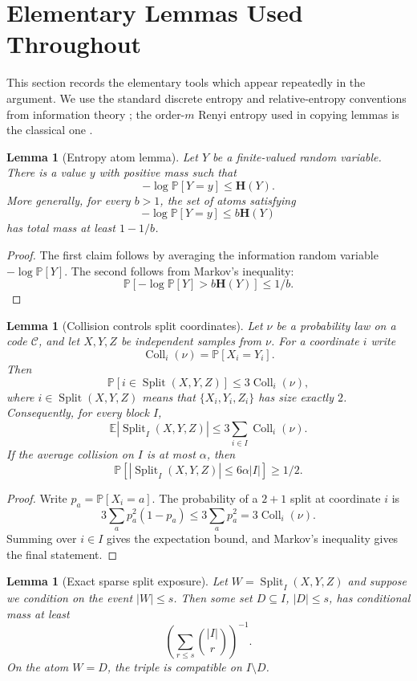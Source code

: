 \documentclass[11pt]{article}
\newtheorem{lemma}[theorem]{Lemma}
\newcommand{\C}{\mathcal C}
\newcommand{\Prb}{\mathbb P}
\newcommand{\EE}{\mathbb E}
\newcommand{\bfH}{\mathbf H}
\newcommand{\Coll}{\operatorname{Coll}}
\newcommand{\Split}{\operatorname{Split}}
\begin{document}
\section{Elementary Lemmas Used Throughout}
\label{sec:elementary}

This section records the elementary tools which appear repeatedly in the
argument.  We use the standard discrete entropy and relative-entropy
conventions from information theory \cite{Shannon48,CoverThomas06,
CsiszarKorner11}; the order-$m$ Renyi entropy used in copying lemmas is the
classical one \cite{Renyi61}.

\begin{lemma}[Entropy atom lemma]
\label{lem:entropy-atom}
Let $Y$ be a finite-valued random variable.  There is a value $y$ with
positive mass such that
\[
  -\log \Prb[Y=y]\le \bfH(Y).
\]
More generally, for every $b>1$, the set of atoms satisfying
\[
  -\log\Prb[Y=y]\le b\bfH(Y)
\]
has total mass at least $1-1/b$.
\end{lemma}

\begin{proof}
The first claim follows by averaging the information random variable
$-\log\Prb[Y]$.  The second follows from Markov's inequality:
\[
  \Prb[-\log\Prb[Y]>b\bfH(Y)]\le 1/b.
\]
\end{proof}

\begin{lemma}[Collision controls split coordinates]
\label{lem:collision-split}
Let $\nu$ be a probability law on a code $\C$, and let $X,Y,Z$ be independent
samples from $\nu$.  For a coordinate $i$ write
\[
  \Coll_i(\nu)=\Prb[X_i=Y_i].
\]
Then
\[
  \Prb[i\in \Split(X,Y,Z)]\le 3\Coll_i(\nu),
\]
where $i\in\Split(X,Y,Z)$ means that $\{X_i,Y_i,Z_i\}$ has size exactly $2$.
Consequently, for every block $I$,
\[
  \EE|\Split_I(X,Y,Z)|\le 3\sum_{i\in I}\Coll_i(\nu).
\]
If the average collision on $I$ is at most $\alpha$, then
\[
  \Prb[|\Split_I(X,Y,Z)|\le 6\alpha |I|]\ge 1/2.
\]
\end{lemma}

\begin{proof}
Write $p_a=\Prb[X_i=a]$.  The probability of a $2+1$ split at coordinate $i$
is
\[
  3\sum_a p_a^2(1-p_a)\le 3\sum_a p_a^2=3\Coll_i(\nu).
\]
Summing over $i\in I$ gives the expectation bound, and Markov's inequality
gives the final statement.
\end{proof}

\begin{lemma}[Exact sparse split exposure]
\label{lem:exact-split}
Let $W=\Split_I(X,Y,Z)$ and suppose we condition on the event $|W|\le s$.
Then some set $D\subseteq I$, $|D|\le s$, has conditional mass at least
\[
  \left(\sum_{r\le s}\binom{|I|}{r}\right)^{-1}.
\]
On the atom $W=D$, the triple is compatible on $I\setminus D$.
\end{lemma}
\end{document}
